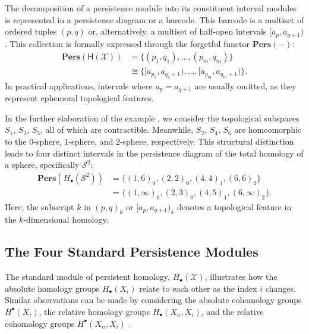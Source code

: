 The decomposition of a persistence module into its constituent interval modules is
represented in a persistence diagram or a barcode. This barcode is a multiset of ordered tuples $(p,q)$ or, alternatively, a multiset
of half-open intervals $[a_{p}, a_{q+1})$. This collection is formally expressed
through the forgetful functor $\textbf{Pers}(-)$:
\begin{align}
    \textbf{Pers}(\mathsf{H}(\mathcal{X})) & = \{(p_{1},q_{1}), \ldots, (p_{m},q_{m})\}                    \\
                                           & \cong \{[a_{p_1}, a_{q_1+1}), \ldots, [a_{p_m}, a_{q_m+1})\}.
\end{align}
In practical applications, intervals where $a_{p} = a_{q+1}$ are usually omitted,
as they represent ephemeral topological features.

\begin{example}
    In the further elaboration of the example \cite[\S 2.2]{de2011dualities}, we consider the topological subspaces $S_{1}$,
    $S_{3}$, $S_{5}$, all of which are contractible. Meanwhile,
    $S_{2}$, $S_{4}$, $S_{6}$ are homeomorphic to the $0$-sphere, $1$-sphere, and $2$-sphere,
    respectively. This structural distinction leads to four distinct intervals in
    the persistence diagram of the total homology of a sphere, specifically $\mathcal{S}^{2}$:
    \begin{align}
        \textbf{Pers}(H_{\bullet}(\mathcal{S}^{2})) & = \{(1,6)_{0}, (2,2)_{0}, (4,4)_{1}, (6,6)_{2} \}             \\
                                                    & = \{(1,\infty)_{0}, (2,3)_{0}, (4,5)_{1}, (6, \infty)_{2} \}.
    \end{align}
    Here, the subscript $k$ in $(p,q)_{k}$ or $[a_{p}, a_{q+1})_{k}$ denotes a topological
    feature in the $k$-dimensional homology.
\end{example}

\subsection{The Four Standard Persistence Modules}
\label{TheFourStandardPersistenceModules}
The standard module of persistent homology, $H_{\bullet}(\mathcal{X})$, illustrates how the absolute homology groups
$H_{\bullet}(X_{i})$ relate to each other as the index $i$ changes. Similar observations
can be made by considering the absolute cohomology groups $H^{\bullet}(X_{i})$,
the relative homology groups $H_{\bullet}(X_{n}, X_{i})$, and the relative cohomology
groups $H^{\bullet}(X_{n}, X_{i})$ \cite[\S 2.4]{de2011dualities}.

